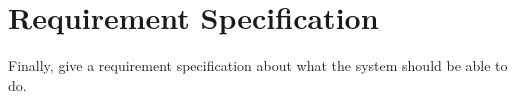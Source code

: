 \section{Requirement Specification}\label{sec:requirement-specification}

Finally, give a requirement specification about what the system should be able to do. 